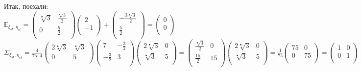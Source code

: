 \documentclass{article}
\begin{document}
Итак, поехали:\\

$\mathbb{E}_{\xi_{st},\eta_{st}}=
\left(
    {\begin{array}{cc}
    	\sqrt[•]{3} & \frac{\sqrt[•]{3}}{2}\\
    		0 & \frac{5}{2} \\
  	\end{array}}
\right)
\left(
	{\begin{array}{c}
  		2\\
  		-1\\
  	\end{array}} 
\right)
+
\left(
  	{\begin{array}{c}
    		-\frac{3\sqrt[•]{3}}{2}\\
    		\frac{5}{2}\\
  	\end{array}}
\right)
=
\left(
	{\begin{array}{c}
  		0\\
  		0\\
  	\end{array}} 
\right)$\\

$\Sigma_{\xi_{st},\eta_{st}}=\frac{4}{75\cdot4}
  	\left(
  		{\begin{array}{cc}
    			2\sqrt[•]{3} & \sqrt[•]{3}\\
    			0 & 5 \\
  		\end{array}}
  	\right)
  	\left(
		{\begin{array}{cc}
    			7 & -\frac{3}{2}\\
     		-\frac{3}{2} & 3\\
  		\end{array}}
  	\right)
  	\left(
  		{\begin{array}{cc}
    			2\sqrt[•]{3} & 0\\
    			\sqrt[•]{3} & 5 \\
  		\end{array}}
  	\right)
  	=
  	\left(
  		{\begin{array}{cc}
    			\frac{\sqrt[•]{3}}{2} & 0\\
    			\frac{15}{2} & 15 \\
  		\end{array}}
  	\right)
  	\left(
  		{\begin{array}{cc}
    			2\sqrt[•]{3} & 0\\
    			\sqrt[•]{3} & 5 \\
  		\end{array}}
  	\right)
  	= \frac{1}{75}
  	\left(
  		{\begin{array}{cc}
    			75 & 0\\
    			0 & 75 \\
  		\end{array}}
  	\right)=
  	\left(
  		{\begin{array}{cc}
    			1 & 0\\
    			0 & 1\\
  		\end{array}}
  	\right)
$\\
\end{document}
